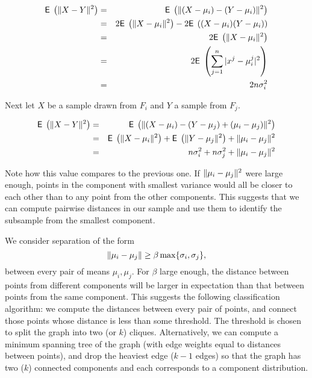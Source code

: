 \documentclass{book}
\numberwithin{exercise}{chapter}
\begin{document}
\begin{eqnarray*}
\hbox{{\sf E}\;}\left(\|X-Y\|^2\right)  &=& \hbox{{\sf E}\;}\left(\|(X-\mu_i) - (Y-\mu_i)\|^2\right) \\
 &=& 2\hbox{{\sf E}\;}\left(\|X-\mu_i\|^2\right) - 2\hbox{{\sf E}\;}\left((X-\mu_i)(Y-\mu_i)\right) \\
 &=& 2\hbox{{\sf E}\;}\left(\|X-\mu_i\|^2\right) \\
 &=& 2\hbox{{\sf E}\;}\left(\sum_{j=1}^n |x^j-\mu_i^j|^2\right) \\
 &=& 2n\sigma_i^2 \\
\end{eqnarray*}

Next let $X$ be a sample drawn from $F_i$ and $Y$ a sample from $F_j$.

\begin{eqnarray*}
\hbox{{\sf E}\;}\left(\|X-Y\|^2\right)  &=& \hbox{{\sf E}\;}\left(\|(X-\mu_i) - (Y-\mu_j) + (\mu_i-\mu_j)\|^2\right) \\
&=& \hbox{{\sf E}\;}\left(\|X-\mu_i\|^2\right) + \hbox{{\sf E}\;}\left(\|Y-\mu_j\|^2\right) + \|\mu_i-\mu_j\|^2 \\
&=&  n\sigma_i^2 + n\sigma_j^2 + \|\mu_i-\mu_j\|^2 \\
\end{eqnarray*}

Note how this value compares to the previous one.
If $\|\mu_i-\mu_j\|^2$ were large enough, points in the component with smallest variance would all be closer to each other than to any point from the other components. This suggests that we can compute pairwise distances in our sample and use them to identify the subsample from the smallest component.

We consider separation of the form
\begin{equation}\label{geom-sep}
\|\mu_i-\mu_j\| \ge \beta \max\{\sigma_i, \sigma_j\},
\end{equation}
between every pair of means $\mu_i, \mu_j$.
For $\beta$ large enough, the distance between points from different
components
will be larger in expectation than that between points from the same component.
This suggests the following classification algorithm: we
compute the distances between every pair of points, and
connect those points whose distance is less than some threshold.  The
threshold is chosen to split the graph into two (or $k$) cliques.
Alternatively, we can compute a minimum spanning tree of
the graph (with edge weights equal to distances between points), and
drop the heaviest edge ($k-1$ edges) so that the graph has two ($k$) connected components and each corresponds to a component distribution.
\end{document}
